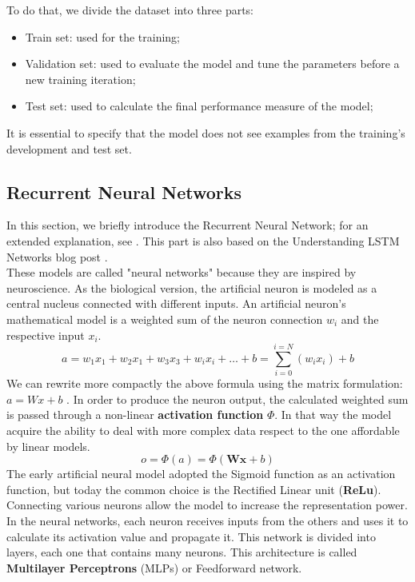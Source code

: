 To do that, we divide the dataset into three parts:
\begin{itemize}
\item Train set: used for the training;
\item Validation set: used to evaluate the model and tune the parameters before a new training iteration;
\item Test set: used to calculate the final performance measure of the model;
\end{itemize}

It is essential to specify that the model does not see examples from the training's development and test set.

\subsection{Recurrent Neural Networks}
In this section, we briefly introduce the Recurrent Neural Network; for an extended explanation, see \cite{lipton2015critical}. This part is also based on the Understanding LSTM Networks blog post \cite{Colah}.\\

These models are called "neural networks" because they are inspired by neuroscience. As the biological version, the artificial neuron is modeled as a central nucleus connected with different inputs.
An artificial neuron's mathematical model is a weighted sum of the neuron connection $w_i$ and the respective input $x_i$.
$$a =w_{1} x_{1}+w_{2} x_{1}+w_{3} x_{3}+w_{i} x_{i}+\ldots+b=\sum_{i=0}^{i=N}\left(w_{i} x_{i}\right)+b$$We can rewrite more compactly the above formula using the matrix formulation: $ a = Wx + b$ . In order to produce the neuron output, the calculated weighted sum is passed through  a non-linear \textbf{activation function} $\Phi$. In that way the model acquire the ability to deal with more complex data respect to the one affordable by linear models.
$$ 
o=\Phi(a)=\Phi(\mathbf{W} \mathbf{x}+b)
$$
The early artificial neural model adopted the Sigmoid function as an activation function, but today the common choice is the Rectified Linear unit (\textbf{ReLu}).
Connecting various neurons allow the model to increase the representation power. In the neural networks, each neuron receives inputs from the others and uses it to calculate its activation value and propagate it. This network is divided into layers, each one that contains many neurons.
This architecture is called \textbf{Multilayer Perceptrons} (MLPs) or Feedforward network. 

